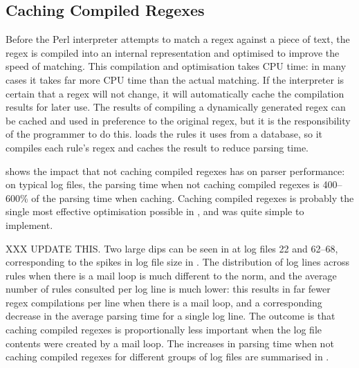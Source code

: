 \subsection{Caching Compiled Regexes}

\label{Caching compiled regexes}

Before the Perl interpreter attempts to match a regex against a piece of
text, the regex is compiled into an internal representation and optimised
to improve the speed of matching.  This compilation and optimisation takes
CPU time: in many cases it takes far more CPU time than the actual
matching.  If the interpreter is certain that a regex will not change, it
will automatically cache the compilation results for later use.   The
results of compiling a dynamically generated regex can be cached and used
in preference to the original regex, but it is the responsibility of the
programmer to do this.  \parsername{} loads the rules it uses from a
database, so it compiles each rule's regex and caches the result to reduce
parsing time.

shows the impact that not caching compiled regexes has on parser
performance: on typical log files, the parsing time when not caching
compiled regexes is 400--600\% of the parsing time when caching.  Caching
compiled regexes is probably the single most effective optimisation
possible in \parsername{}, and was quite simple to implement.


XXX UPDATE THIS\@.  Two large dips can be seen in  at log files 22 and
62--68, corresponding to the spikes in log file size in .  The distribution of log
lines across rules when there is a mail loop is much different to the norm,
and the average number of rules consulted per log line is much lower: this
results in far fewer regex compilations per line when there is a mail loop,
and a corresponding decrease in the average parsing time for a single log
line.  The outcome is that caching compiled regexes is proportionally less
important when the log file contents were created by a mail loop.  The
increases in parsing time when not caching compiled regexes for different
groups of log files are summarised in .

